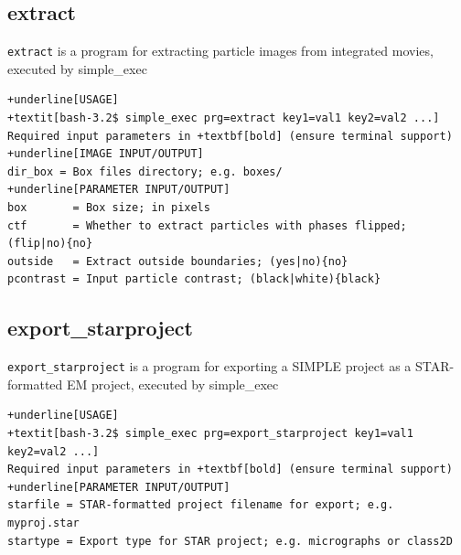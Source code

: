 \documentclass[a4paper,11pt]{article}
\newcommand{\prgname}[1]{\textcolor{NavyBlue}{\texttt{#1}}}
\begin{document}
\subsection{extract}
\label{extract}
\prgname{extract} is a program for extracting particle images from integrated movies, executed by simple\_exec
\begin{Verbatim}[commandchars=+\[\],fontsize=\small,breaklines=true]
+underline[USAGE]
+textit[bash-3.2$ simple_exec prg=extract key1=val1 key2=val2 ...]
Required input parameters in +textbf[bold] (ensure terminal support)
+underline[IMAGE INPUT/OUTPUT]
dir_box = Box files directory; e.g. boxes/
+underline[PARAMETER INPUT/OUTPUT]
box       = Box size; in pixels
ctf       = Whether to extract particles with phases flipped; (flip|no){no}
outside   = Extract outside boundaries; (yes|no){no}
pcontrast = Input particle contrast; (black|white){black}
\end{Verbatim}

\subsection{export\_starproject}
\label{export_starproject}
\prgname{export\_starproject} is a program for exporting a SIMPLE project as a STAR-formatted EM project, executed by simple\_exec
\begin{Verbatim}[commandchars=+\[\],fontsize=\small,breaklines=true]
+underline[USAGE]
+textit[bash-3.2$ simple_exec prg=export_starproject key1=val1 key2=val2 ...]
Required input parameters in +textbf[bold] (ensure terminal support)
+underline[PARAMETER INPUT/OUTPUT]
starfile = STAR-formatted project filename for export; e.g. myproj.star
startype = Export type for STAR project; e.g. micrographs or class2D
\end{Verbatim}
\end{document}
